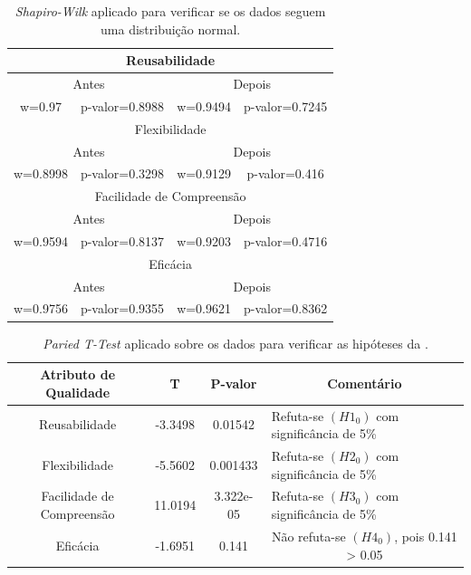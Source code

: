 \begin{table}[]
\centering
\caption{\textit{Shapiro-Wilk} aplicado para verificar se os dados seguem uma distribuição normal.}
\label{tab:shapiro_experimento_1}
\begin{tabular}{|c|c|c|c|}
\hline
\multicolumn{4}{|c|}{Reusabilidade}                       \\ \hline
\multicolumn{2}{|c|}{Antes} & \multicolumn{2}{c|}{Depois} \\ \hline
w=0.97        & p-valor=0.8988        & w=0.9494        & p-valor=0.7245        \\ \hline
\multicolumn{4}{|c|}{Flexibilidade}                       \\ \hline
\multicolumn{2}{|c|}{Antes} & \multicolumn{2}{c|}{Depois} \\ \hline
w=0.8998        & p-valor=0.3298        & w=0.9129        & p-valor=0.416        \\ \hline
\multicolumn{4}{|c|}{Facilidade de Compreensão}           \\ \hline
\multicolumn{2}{|c|}{Antes} & \multicolumn{2}{c|}{Depois} \\ \hline
w=0.9594        & p-valor=0.8137        & w=0.9203        & p-valor=0.4716         \\ \hline
\multicolumn{4}{|c|}{Eficácia}                            \\ \hline
\multicolumn{2}{|c|}{Antes} & \multicolumn{2}{c|}{Depois} \\ \hline
w=0.9756        & p-valor=0.9355         & w=0.9621        & p-valor=0.8362        \\ \hline
\end{tabular}
\end{table}


\begin{table}[]
\centering
\caption{\textit{Paried T-Test} aplicado sobre os dados para verificar as hipóteses da .}
\label{tab:experimento_1_10_15}
\begin{tabular}{|m{1cm}|l|l|m{7.1cm}|}
\hline
\multicolumn{1}{|c|}{Atributo de Qualidade} & \multicolumn{1}{c|}{T} & \multicolumn{1}{c|}{P-valor} & \multicolumn{1}{c|}{Comentário} \\ \hline
\multicolumn{1}{|c|}{Reusabilidade} & \multicolumn{1}{c|}{-3.3498} & \multicolumn{1}{c|}{0.01542} & Refuta-se \textbf{$(H1_{0})$} com significância de 5\%\\ \hline
\multicolumn{1}{|c|}{Flexibilidade} &\multicolumn{1}{c|}{-5.5602}& \multicolumn{1}{c|}{0.001433} &Refuta-se \textbf{$(H2_{0})$} com significância de 5\%\\ \hline
\multicolumn{1}{|c|}{Facilidade de Compreensão} & \multicolumn{1}{c|}{11.0194} &    \multicolumn{1}{c|}{3.322e-05}&Refuta-se \textbf{$(H3_{0})$} com significância de 5\%\\ \hline
\multicolumn{1}{|c|}{Eficácia}&\multicolumn{1}{c|}{-1.6951}&\multicolumn{1}{c|}{0.141}&\multicolumn{1}{c|}{Não refuta-se \textbf{$(H4_{0})$}, pois 0.141 > 0.05}\\ \hline
\end{tabular}
\end{table}

